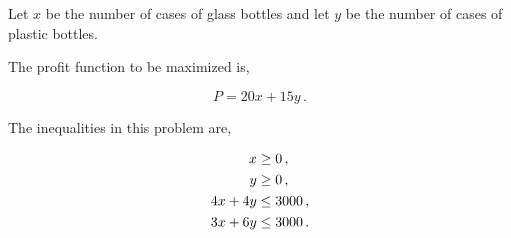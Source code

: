 %
%

\usetikzlibrary{patterns}

\begin{subquestions}


\subquestion

Let $x$ be the number of cases of glass bottles and let $y$ be the number of cases of plastic bottles.

\begin{subsubquestions}

\subsubquestion

\begin{subsubsubquestions}


\subsubsubquestion

The profit function to be maximized is,

\begin{equation}
	P = 20x + 15y \,.
\end{equation}


\subsubsubquestion

The inequalities in this problem are,

\begin{align}
	x & \geq 0 \,, \nonumber \\
	y & \geq 0 \,, \nonumber \\
	4x + 4y & \leq 3000 \,, \nonumber \\
	3x + 6y & \leq 3000 \,.
\end{align}


\end{subsubsubquestions}
\end{subsubquestions}
\end{subquestions}
